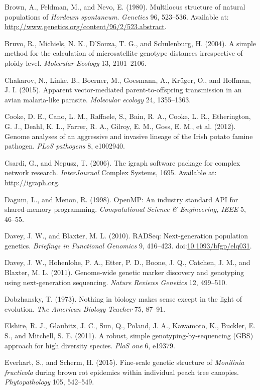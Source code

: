 \documentclass{frontiersSCNS} %
\begin{document}
Brown, A., Feldman, M., and Nevo, E. (1980). Multilocus structure of
natural populations of \emph{Hordeum spontaneum}. \emph{Genetics} 96,
523--536. Available at:
\url{http://www.genetics.org/content/96/2/523.abstract}.

Bruvo, R., Michiels, N. K., D'Souza, T. G., and Schulenburg, H. (2004).
A simple method for the calculation of microsatellite genotype distances
irrespective of ploidy level. \emph{Molecular Ecology} 13, 2101--2106.

Chakarov, N., Linke, B., Boerner, M., Goesmann, A., Kr{\"{u}}ger, O., and
Hoffman, J. I. (2015). Apparent vector-mediated parent-to-offspring
transmission in an avian malaria-like parasite. \emph{Molecular ecology}
24, 1355--1363.

Cooke, D. E., Cano, L. M., Raffaele, S., Bain, R. A., Cooke, L. R.,
Etherington, G. J., Deahl, K. L., Farrer, R. A., Gilroy, E. M., Goss, E.
M., et al. (2012). Genome analyses of an aggressive and invasive lineage
of the Irish potato famine pathogen. \emph{PLoS pathogens} 8, e1002940.

Csardi, G., and Nepusz, T. (2006). The igraph software package for
complex network research. \emph{InterJournal} Complex Systems, 1695.
Available at: \url{http://igraph.org}.

Dagum, L., and Menon, R. (1998). OpenMP: An industry standard API for
shared-memory programming. \emph{Computational Science \& Engineering,
IEEE} 5, 46--55.

Davey, J. W., and Blaxter, M. L. (2010). RADSeq: Next-generation
population genetics. \emph{Briefings in Functional Genomics} 9,
416--423.
doi:\href{http://dx.doi.org/10.1093/bfgp/elq031}{10.1093/bfgp/elq031}.

Davey, J. W., Hohenlohe, P. A., Etter, P. D., Boone, J. Q., Catchen, J.
M., and Blaxter, M. L. (2011). Genome-wide genetic marker discovery and
genotyping using next-generation sequencing. \emph{Nature Reviews
Genetics} 12, 499--510.

Dobzhansky, T. (1973). Nothing in biology makes sense except in the
light of evolution. \emph{The American Biology Teacher} 75, 87--91.

Elshire, R. J., Glaubitz, J. C., Sun, Q., Poland, J. A., Kawamoto, K.,
Buckler, E. S., and Mitchell, S. E. (2011). A robust, simple
genotyping-by-sequencing (GBS) approach for high diversity species.
\emph{PloS one} 6, e19379.

Everhart, S., and Scherm, H. (2015). Fine-scale genetic structure of
\emph{Monilinia fructicola} during brown rot epidemics within individual
peach tree canopies. \emph{Phytopathology} 105, 542--549.
\end{document}
